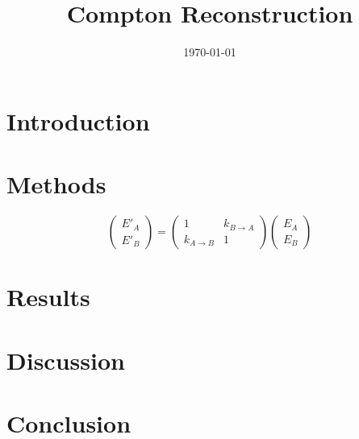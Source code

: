 \documentclass[11pt]{article}
\title{Compton Reconstruction}
\author{}
\date{\today}
\begin{document}
\maketitle

\begin{abstract}
\end{abstract}

\section{Introduction}

\section{Methods}

\[\begin{pmatrix}
    E'_{A} \\ E'_{B} 
\end{pmatrix}
=
\begin{pmatrix}
    1 & k_{B\to A} \\
    k_{A\to B} & 1
\end{pmatrix}
\begin{pmatrix}
    E_{A} \\ E_{B}
\end{pmatrix}
\]

\section{Results}

\section{Discussion}

\section{Conclusion}



\end{document}
